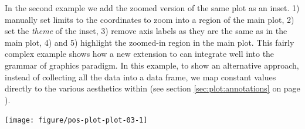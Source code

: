 \documentclass[krantz2]{krantz}\usepackage{knitr}%
\begin{document}
In the second example we add the zoomed version of the same plot as an inset. 1) manually set limits to the coordinates to zoom into a region of the main plot, 2) set the \emph{theme} of the inset, 3) remove axis labels as they are the same as in the main plot, 4) and 5) highlight the zoomed-in region in the main plot. This fairly complex example shows how a new extension to  can integrate well into the grammar of graphics paradigm. In this example, to show an alternative approach, instead of collecting all the data into a data frame, we map constant values directly to the various aesthetics within  (see section \ref{sec:plot:annotations} on page \pageref{sec:plot:annotations}).

\begin{knitrout}\footnotesize
{}\color{fgcolor}\begin{kframe}
\begin{alltt}
 \hlkwb{<-} \hlstd{(}  \hlstd{(}     \hlstd{=}  \hlopt{+}
  \hlstd{()}
 \hlkwb{<-}  \hlopt{+}
  \hlstd{(} \hlstd{=} \hlstd{(}\hlstd{,} \hlstd{),}  \hlstd{=} \hlstd{(}\hlstd{,} \hlstd{))} \hlopt{+}
  \hlstd{(} \hlstd{=} \hlstd{,}  \hlstd{=} \hlstd{)} \hlopt{+}
  \hlstd{(} \hlstd{=} \hlstd{)} \hlopt{+}
  \hlstd{(}\hlstd{)} \hlopt{+} \hlstd{(} \hlstd{=} \hlstd{)}
 \hlopt{+}
  \hlstd{(} \hlstd{=} \hlstd{,}  \hlstd{=} \hlstd{,}  \hlstd{=}   \hlstd{=} \hlopt{/}\hlstd{,}
             \hlstd{=} \hlstd{,}  \hlstd{=} \hlstd{)} \hlopt{+}
  \hlstd{(} \hlstd{=} \hlstd{,}  \hlstd{=} \hlstd{,}  \hlstd{=} \hlstd{,}
            \hlstd{=} \hlstd{,}  \hlstd{=} \hlstd{,}  \hlstd{=} \hlstd{,}  \hlstd{=} \hlstd{,}
            \hlstd{=} \hlstd{)}
\end{alltt}
\end{kframe}

{\centering \texttt{[image: figure/pos-plot-plot-03-1]} 

}



\end{knitrout}
\end{document}
